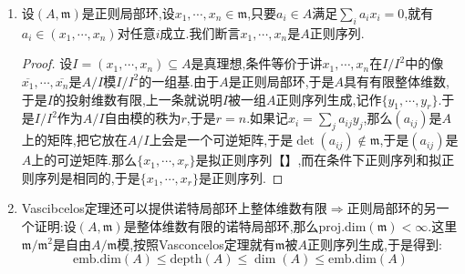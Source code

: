 \begin{enumerate}
\begin{proof}
    	(a)$\Rightarrow$(b):设$I$被$A$正则序列$\{x_1,\cdots,x_r\}$生成,那么典范的分次$A/I$代数映射$(A/I)[X_1,\cdots,X_r]\to\mathrm{gr}_A^I=\oplus_{n\ge0}I^n/I^{n+1}$,$X_i\mapsto\overline{x_i}$是同构(我们之前解释过拟正则序列就保证它是同构).特别的有$I/I^2$是自由$A/I$模.
    	
    	\qquad
    	
    	(b)$\Rightarrow$(a):不妨设$I\not=0$,否则约定空集生成的理想是零理想.因为$I$具有有限投射维数,于是$A/I$作为$A$模也具有有限投射维数.因为$A$是局部环,于是投射$A$模都是自由模,于是$A$模$A/I$具有FFR.由于$\mathrm{Ann}(A/I)=I\not=0$,上一条的证明里得到$I$不包含在每个伴随素理想里,于是$I$不包含在所有$A$的伴随素理想的并以及$I\mathfrak{m}$中(因为不能有$I=I\mathfrak{m}$),于是可取$x\in I$,但$x$不在$A$的每个伴随素理想里,也不在$I\mathfrak{m}$里.那么$x$是$A$正则的,并且$x$在$I/I^2$中的像$\overline{x}$是$A/I$自由模$I/I^2$的基的一部分,因为NAK引理的推论说明$A/\mathfrak{m}$模$I/I\mathfrak{m}$的基可以提升为$A/I$模$I/I^2$的基.
    	
    	\qquad
    	
    	下面设$B=A/xA$,我们断言$I^*=I/xA$是投射维数有限的$B$模:因为$x$是$A$正则的,对每个整数$i$就有$\mathrm{Ext}_A^i(I,N)\cong\mathrm{Ext}_B^i(I/xI,N)$.于是从$\mathrm{proj.dim}_A(I)<\infty$得到$\mathrm{proj.dim}_B(I/xI)<\infty$.和我们在证整体维数有限推正则环中一样,有$I^*=I/xA$是$I/xI$的直和项.于是$\mathrm{proj.dim}_B(I^*)\le\mathrm{proj.dim}_B(I/xI)<\infty$.按照$I^*/(I^*)^2\cong I/(I^2+Ax)\cong(I/I^2)/((A/I)x)$,其中$I/I^2$是$A/I$自由模,并且$x$在$I/I^2$上的像能张成一组基,于是$(I/I^2)/((A/I)x)$是自由$A/I=B/I^*$模.并且$\mathrm{rank}_{A/I}(I/I^2)=\mathrm{rank}_{B/I^*}(I^*/(I^*)^2)-1$,所以只要对$\mathrm{rank}_{A/I}(I/I^2)$归纳得证.
    \end{proof}
    \item 设$(A,\mathfrak{m})$是正则局部环,设$x_1,\cdots,x_n\in\mathfrak{m}$,只要$a_i\in A$满足$\sum_ia_ix_i=0$,就有$a_i\in(x_1,\cdots,x_n)$对任意$i$成立.我们断言$x_1,\cdots,x_n$是$A$正则序列.
    \begin{proof}
    	
    	设$I=(x_1,\cdots,x_n)\subseteq A$是真理想,条件等价于讲$x_1,\cdots,x_n$在$I/I^2$中的像$\overline{x_1},\cdots,\overline{x_n}$是$A/I$模$I/I^2$的一组基.由于$A$是正则局部环,于是$A$具有有限整体维数,于是$I$的投射维数有限,上一条就说明$I$被一组$A$正则序列生成,记作$\{y_1,\cdots,y_r\}$.于是$I/I^2$作为$A/I$自由模的秩为$r$,于是$r=n$.如果记$x_i=\sum_ja_{ij}y_j$,那么$\left(a_{ij}\right)$是$A$上的矩阵,把它放在$A/I$上会是一个可逆矩阵,于是$\det\left(a_{ij}\right)\not\in\mathfrak{m}$,于是$\left(a_{ij}\right)$是$A$上的可逆矩阵.那么$\{x_1,\cdots,x_r\}$是拟正则序列【】,而在条件下正则序列和拟正则序列是相同的,于是$\{x_1,\cdots,x_r\}$是正则序列.
    \end{proof}
    \item Vascibcelos定理还可以提供诺特局部环上整体维数有限$\Rightarrow$正则局部环的另一个证明:设$(A,\mathfrak{m})$是整体维数有限的诺特局部环,那么$\mathrm{proj.dim}(\mathfrak{m})<\infty$.这里$\mathfrak{m}/\mathfrak{m}^2$是自由$A/\mathfrak{m}$模,按照Vasconcelos定理就有$\mathfrak{m}$被$A$正则序列生成,于是得到:
    $$\mathrm{emb.dim}(A)\le\mathrm{depth}(A)\le\dim(A)\le\mathrm{emb.dim}(A)$$
    

\end{enumerate}
